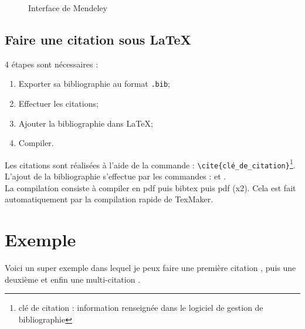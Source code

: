 \documentclass[a4paper,12pt]{report}
\begin{document}
\begin{figure}[hbtp]
	\centering
	\def\svgwidth{1\columnwidth}
	\fontsize{10pt}{10pt}\selectfont
	\caption{Interface de Mendeley}
	\label{figure_mendeley}
\end{figure}


\subsection{Faire une citation sous \LaTeX}
4 étapes sont nécessaires :
\begin{enumerate}
\item Exporter sa bibliographie au format \verb|.bib|;
\item Effectuer les citations;
\item Ajouter la bibliographie dans \LaTeX; 
\item Compiler.
\end{enumerate}

Les citations sont réalisées à l'aide de la commande : \verb|\cite{clé_de_citation}|\footnote{clé de citation : information renseignée dans le logiciel de gestion de bibliographie}. \\ 

L'ajout de la bibliographie s'effectue par les commandes : \verb|| et \verb||. \\

La compilation consiste à compiler en pdf puis bibtex puis pdf (x2). Cela est fait automatiquement par la compilation rapide de TexMaker.



\section{Exemple}

Voici un super exemple dans lequel je peux faire une première citation \cite{collomb2017}, puis une deuxième \cite{collomb2018} et enfin une multi-citation \cite{collomb2018a, collomb2017a}.







\end{document}
